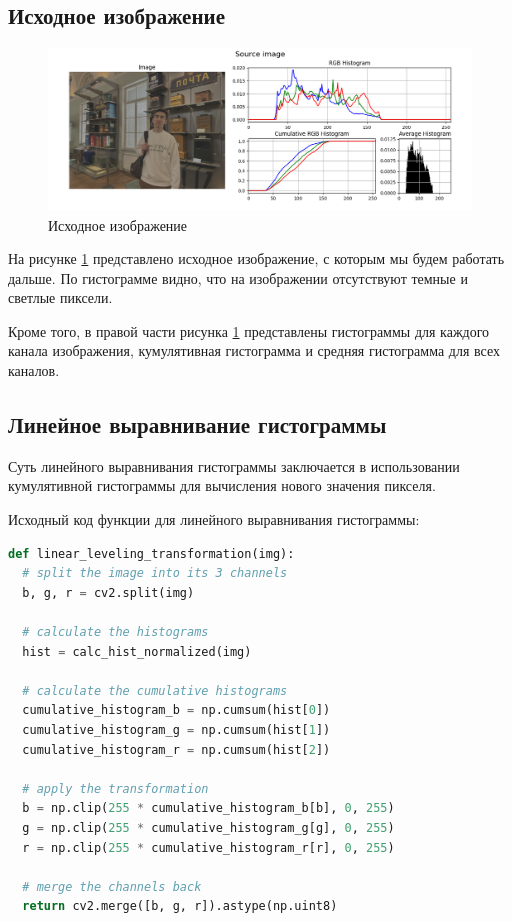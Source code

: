 \subsection{Исходное изображение}

\begin{figure}[H]
    \centering
    \includegraphics[width=\textwidth]{../results/Source image.png}
    \caption{Исходное изображение}
    \label{fig:source}
\end{figure}

На рисунке \ref{fig:source} представлено исходное изображение, с которым мы будем работать дальше. По гистограмме видно, что на изображении отсутствуют темные и светлые пиксели. 

Кроме того, в правой части рисунка \ref{fig:source} представлены гистограммы для каждого канала изображения, кумулятивная гистограмма и средняя гистограмма для всех каналов.

\subsection{Линейное выравнивание гистограммы}

Суть линейного выравнивания гистограммы заключается в использовании кумулятивной гистограммы для вычисления нового значения пикселя.

Исходный код функции для линейного выравнивания гистограммы:

\begin{lstlisting}[language=Python]
def linear_leveling_transformation(img):
  # split the image into its 3 channels
  b, g, r = cv2.split(img)

  # calculate the histograms
  hist = calc_hist_normalized(img)

  # calculate the cumulative histograms
  cumulative_histogram_b = np.cumsum(hist[0]) 
  cumulative_histogram_g = np.cumsum(hist[1])
  cumulative_histogram_r = np.cumsum(hist[2])

  # apply the transformation
  b = np.clip(255 * cumulative_histogram_b[b], 0, 255)
  g = np.clip(255 * cumulative_histogram_g[g], 0, 255)
  r = np.clip(255 * cumulative_histogram_r[r], 0, 255)

  # merge the channels back
  return cv2.merge([b, g, r]).astype(np.uint8)
\end{lstlisting}


